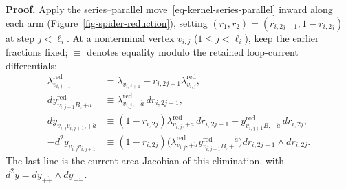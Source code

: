 \documentclass[11pt]{article}
\numberwithin{equation}{section}
\numberwithin{figure}{section}
\numberwithin{table}{section}
\begin{document}
\begin{proofbox}
\textbf{Proof.} Apply the series--parallel move~\eqref{eq-kernel-series-parallel} inward along each arm (Figure~\ref{fig-spider-reduction}), setting $(r_1,r_2)=(r_{i,2j-1},1-r_{i,2j})$ at step $j<\ell_i$.
At a nonterminal vertex $v_{i,j}$ ($1\le j<\ell_i$), keep the earlier fractions fixed; $\equiv$ denotes equality modulo the retained loop-current differentials:
\begin{equation}\label{eq-spider-arm-step}
\begin{aligned}
\lambda_{v_{i,j+1}}^{\mathrm{red}}
&=\lambda_{v_{i,j+1}}+r_{i,2j-1}\lambda_{v_{i,j}}^{\mathrm{red}},\\
dy_{v_{i,j+1}B,+\dot a}^{\mathrm{red}}
&\equiv\lambda_{v_{i,j},+\dot a}^{\mathrm{red}}\,dr_{i,2j-1},\\
dy_{v_{i,j}v_{i,j+1},+\dot a}
&\equiv(1-r_{i,2j})\lambda_{v_{i,j},+\dot a}^{\mathrm{red}}\,dr_{i,2j-1}
-y_{v_{i,j+1}B,+\dot a}^{\mathrm{red}}\,dr_{i,2j},\\
-d^2y_{v_{i,j}v_{i,j+1}}
&\equiv(1-r_{i,2j})
\bigl(\lambda_{v_{i,j},+\dot a}^{\mathrm{red}}
y_{v_{i,j+1}B,+}^{\mathrm{red}}{}^{\dot a}\bigr)
dr_{i,2j-1}\wedge dr_{i,2j}.
\end{aligned}
\end{equation}
The last line is the current-area Jacobian of this elimination, with $d^2y=dy_{+\dot+}\wedge dy_{+\dot-}$.


\end{proofbox}
\end{document}
